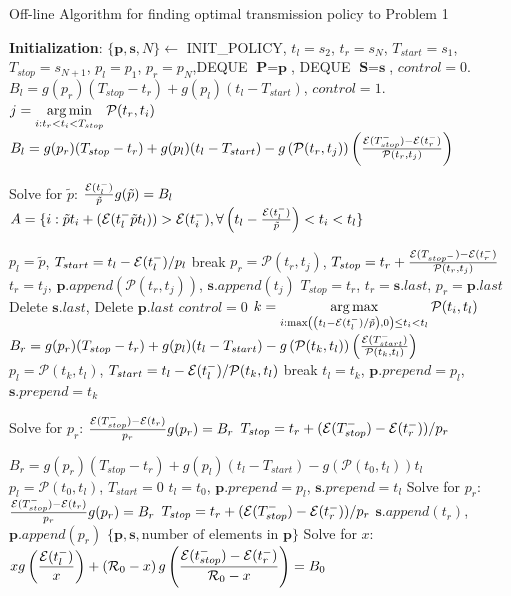 \begin{algorithm}
\caption{Off-line Algorithm for finding optimal transmission policy to Problem 1}
\label{Algorithm1}
\begin{algorithmic}[1]
\State \textbf{Initialization}: $\{\textbf{p},\textbf{s},N\}\gets$ INIT\_POLICY, $t_l=s_2$, $t_{r}=s_{N}$, $T_{start}=s_1$, $T_{stop}=s_{N+1}$, $p_l=p_1$, $p_r=p_{N}$,DEQUE $\textbf{P}=\textbf{p}$, DEQUE $\textbf{S}=\textbf{s}$, $control=0$. 
		\State $B_l=g(p_r)(T_{stop}-t_r)+g(p_l)(t_l-T_{start})$, $control=1$.
	\Else
		\State $j=\displaystyle \operatorname*{arg\,min}_{i:t_r<t_i < T_{stop}} \mathcal{P}(t_r,t_i)$
		\State $B_l=g(p_r)(T_{stop}-t_r)+g(p_l)(t_l-T_{start})-g\left(\mathcal{P}(t_r,t_j)\right)						\left(\frac{\mathcal{E}(T_{stop}^-)-\mathcal{E}(t_r^-)}{\mathcal{P}(t_r,t_j)}\right) $
	\EndIf

	\State Solve for $\tilde{p}$: $\frac{\mathcal{E}(t_l^-)}{\tilde{p}}g(\tilde{p})=B_l$
	\State $A=\{i:\tilde{p}t_i+(\mathcal{E}(t_l^-\tilde{p}t_l))> \mathcal{E}(t_i^-), \forall \left(t_l-					\frac{\mathcal{E}(t_l^-)}{\tilde{p}}\right)<t_i<t_l\}$

		\State $p_l=\tilde{p}$, $T_{start}=t_l-\mathcal{E}(t_l^-)/p_l$
	     break \EndIf
			\State $p_r=\mathcal{P}(t_r,t_j)$, $T_{stop}=t_r+\frac{\mathcal{E}(T_{stop^-})-\mathcal{E}(t_r^-)}							{\mathcal{P}					(t_r,t_j)}$
			\State $t_r=t_j$, $\textbf{p}.append(\mathcal{P}(t_r,t_j))$, $\textbf{s}.append( t_j)$ 
		\Else
			\State $T_{stop}=t_r$, $t_r=\textbf{s}.last$, $p_r=\textbf{p}.last$
			\State Delete $\textbf{s}.last$, Delete $\textbf{p}.last$
			\State $control=0$
		\EndIf
	\Else 
		\State $k=\displaystyle \operatorname*{arg\,max}_{i:\max\left(\left(t_l-\mathcal{E}(t_l^-)/\tilde{p}\right),0\right)					\le t_i <t_l} \mathcal{P}(t_i,t_l)$
		\State $B_r=g(p_r)(T_{stop}-t_r)+g(p_l)(t_l-T_{start})-g\left(\mathcal{P}(t_k,t_l)\right)							\left(\frac{\mathcal{E}(T_{start}^-)}{\mathcal{P}(t_k,t_l)}\right)$
		\State $p_l=\mathcal{P}(t_k,t_l)$, $T_{start}=t_l-\mathcal{E}(t_l^-)/\mathcal{P}(t_k,t_l)$
		  break \EndIf
		\State $t_l=t_k$, $\textbf{p}.prepend=p_l$, $\textbf{s}.prepend=t_k$
	
		\State Solve for $p_r$: $\frac{\mathcal{E}(T_{stop}^-)-\mathcal{E}(t_r)}{p_r}g(p_r)=B_r$
		\State $T_{stop}=t_r+(\mathcal{E}(T_{stop}^-)-\mathcal{E}(t_r^-))/p_r$	
	\EndIf

\EndWhile

	\State $B_r=g(p_r)(T_{stop}-t_r)+g(p_l)(t_l-T_{start})-g\left(\mathcal{P}(t_0,t_l)\right)t_l$
	\State $p_l=\mathcal{P}(t_0,t_l)$, $T_{start}=0$
	\State $t_l=t_0$, $\textbf{p}.prepend=p_l$, $\textbf{s}.prepend=t_l$
	\State Solve for $p_r$: $\frac{\mathcal{E}(T_{stop}^-)-\mathcal{E}(t_r)}{p_r}g(p_r)=B_r$
	\State $T_{stop}=t_r+(\mathcal{E}(T_{stop}^-)-\mathcal{E}(t_r^-))/p_r$
	\State $\textbf{s}.append(t_r)$, $\textbf{p}.append(p_r)$
	\State \Return $\{\textbf{p},\textbf{s}, \text{number of elements in } \textbf{p} \}$
\EndIf
\State Solve for  $x$: $xg\left(\dfrac{\mathcal{E}(t_{l}^-)}{x}\right)+\left(\mathcal{R}_0-x\right) g \left(\dfrac{\mathcal{E}(t_{stop}^-)-\mathcal{E}(t_{r}^-)}{\mathcal{R}_0-x}\right) = B_0$


\end{algorithmic}
\end{algorithm}
